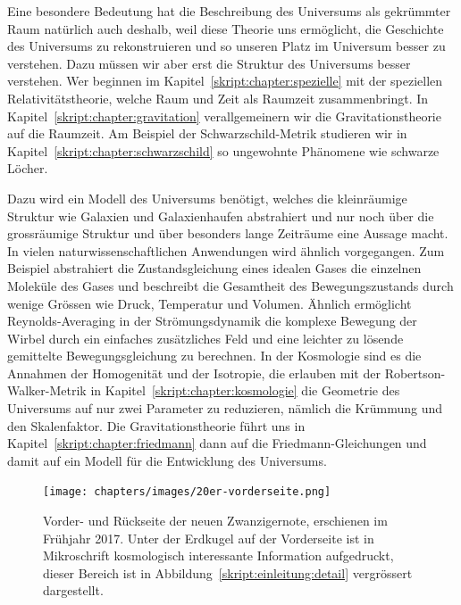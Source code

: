 Eine besondere Bedeutung hat die Beschreibung des Universums als gekrümmter
Raum natürlich auch deshalb, weil diese Theorie uns ermöglicht,
die Geschichte des Universums zu rekonstruieren und so
unseren Platz im Universum besser zu verstehen.
Dazu müssen wir aber erst die Struktur des Universums besser verstehen.
Wer beginnen im Kapitel~\ref{skript:chapter:spezielle} mit der
speziellen Relativitätstheorie, welche Raum und Zeit als Raumzeit
zusammenbringt.
In Kapitel~\ref{skript:chapter:gravitation} verallgemeinern wir die
Gravitationstheorie auf die Raumzeit.
Am Beispiel der Schwarzschild-Metrik studieren wir in
Kapitel~\ref{skript:chapter:schwarzschild} so ungewohnte Phänomene
wie schwarze Löcher.

Dazu wird ein Modell des Universums benötigt, welches die kleinräumige
Struktur wie Galaxien und Galaxienhaufen abstrahiert und nur noch
über die grossräumige Struktur und über besonders lange Zeiträume
eine Aussage macht.
In vielen naturwissenschaftlichen Anwendungen wird ähnlich vorgegangen.
Zum Beispiel abstrahiert die Zustandsgleichung eines idealen Gases
die einzelnen Moleküle des Gases und beschreibt die Gesamtheit des
Bewegungszustands durch wenige Grössen wie Druck, Temperatur und Volumen.
Ähnlich ermöglicht Reynolds-Averaging in der Strömungsdynamik die 
komplexe Bewegung der Wirbel durch ein einfaches zusätzliches Feld und
eine leichter zu lösende gemittelte Bewegungsgleichung zu berechnen.
In der Kosmologie sind es die Annahmen der Homogenität und der Isotropie,
die erlauben mit der Robertson-Walker-Metrik in
Kapitel~\ref{skript:chapter:kosmologie} die Geometrie des Universums auf
nur zwei Parameter zu reduzieren, nämlich die Krümmung und den Skalenfaktor.
Die Gravitationstheorie führt uns in Kapitel~\ref{skript:chapter:friedmann}
dann auf die Friedmann-Gleichungen und damit auf ein Modell für die
Entwicklung des Universums.

\begin{figure}
\centering
\texttt{[image: chapters/images/20er-vorderseite.png]}
\caption{Vorder- und Rückseite der neuen Zwanzigernote, erschienen
im Frühjahr 2017.
Unter der Erdkugel auf der Vorderseite ist in Mikroschrift kosmologisch
interessante Information aufgedruckt, dieser Bereich ist in
Abbildung~\ref{skript:einleitung:detail} vergrössert dargestellt.
\label{skript:einleitung:noten}}
\end{figure}

